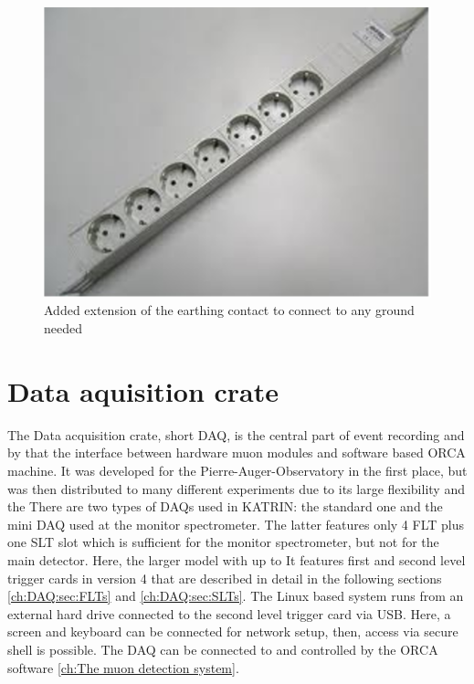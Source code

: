   \begin{figure}
  \centering
  
  	\includegraphics[width = 0.4 \textwidth]{graphics/setup/multiplug.pdf}
  \caption[Multiplug grounding]{Added extension of the earthing contact to connect to any ground needed}
  \label{fig:multiplug}
  \end{figure}



\section{Data aquisition crate}
\label{ch:DAQ}
The Data acquisition crate, short DAQ, is the central part of event recording and by that the interface between hardware muon modules and software based ORCA machine. It was developed for the Pierre-Auger-Observatory in the first place, but was then distributed to many different experiments due to its large flexibility and the There are two types of DAQs used in KATRIN: the standard one and the mini DAQ used at the monitor spectrometer. The latter features only 4 FLT plus one SLT slot which is sufficient for the monitor spectrometer, but not for the main detector. Here, the larger model with up to  It features first and second level trigger cards in version \SI{4}{} that are described in detail in the following sections \ref{ch:DAQ:sec:FLTs} and \ref{ch:DAQ:sec:SLTs}. The Linux based system runs from an external hard drive connected to the second level trigger card via USB. Here, a screen and keyboard can be connected for network setup, then, access via secure shell is possible. The DAQ can be connected to and controlled by the ORCA software \ref{ch:The muon detection system}. 
